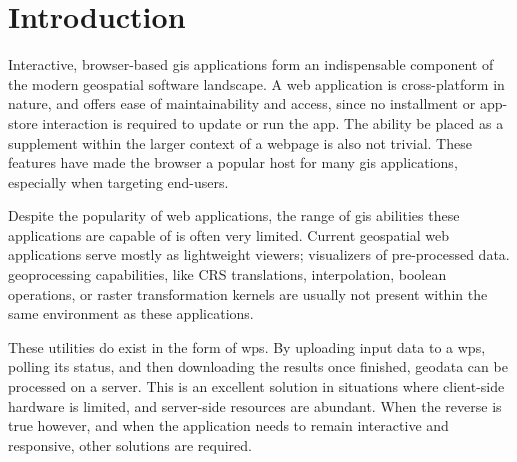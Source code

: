 

\newpage
\section{Introduction}



Interactive, browser-based \ac{gis} applications form an indispensable component of the modern geospatial software landscape. A web application is cross-platform in nature, and offers ease of maintainability and access, since no installment or app-store interaction is required to update or run the app. The ability be placed as a supplement within the larger context of a webpage is also not trivial. These features have made the browser a popular host for many \ac{gis} applications, especially when targeting end-users. 

Despite the popularity of web applications, the range of \ac{gis} abilities these applications are capable of is often very limited. Current geospatial web applications serve mostly as lightweight viewers; visualizers of pre-processed data. \ac{geoprocessing} capabilities, like CRS translations, interpolation, boolean operations, or raster transformation kernels are usually not present within the same environment as these applications. 

These utilities do exist in the form of \ac{wps}. By uploading input data to a \ac{wps}, polling its status, and then downloading the results once finished, geodata can be processed on a server. This is an excellent solution in situations where client-side hardware is limited, and server-side resources are abundant. When the reverse is true however, and when the application needs to remain interactive and responsive, other solutions are required.

